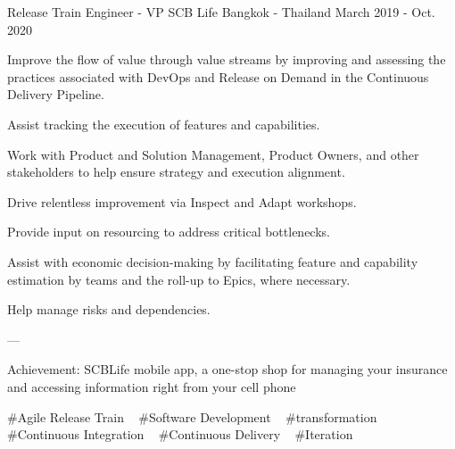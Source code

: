 \begin{cventries}
  \cventry
    {Release Train Engineer - VP} %
    {SCB Life} %
    {Bangkok - Thailand} %
    {March 2019 - Oct. 2020} %
    {
      \begin{cvitems} %
        \item {Improve the flow of value through value streams by improving and assessing the practices associated with DevOps and Release on Demand in the Continuous Delivery Pipeline.}
        \item {Assist tracking the execution of features and capabilities.}
        \item {Work with Product and Solution Management, Product Owners, and other stakeholders to help ensure strategy and execution alignment.}
        \item {Drive relentless improvement via Inspect and Adapt workshops.}
        \item {Provide input on resourcing to address critical bottlenecks.}
        \item {Assist with economic decision-making by facilitating feature and capability estimation by teams and the roll-up to Epics, where necessary.}
        \item {Help manage risks and dependencies.}
        \item {---}
        \item {Achievement: SCBLife mobile app, a one-stop shop for managing your insurance and accessing information right from your cell phone}
      \end{cvitems}
    }
    {
      \#Agile Release Train ~
      \#Software Development ~
      \#transformation ~
      \#Continuous Integration ~
      \#Continuous Delivery ~
      \#Iteration ~
    }


\end{cventries}

